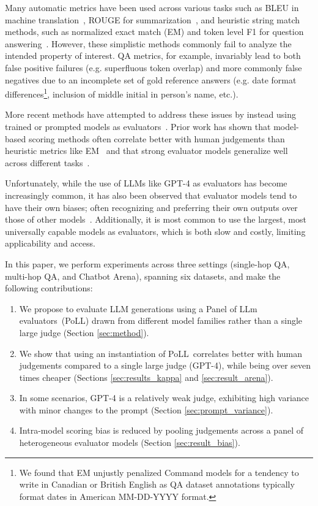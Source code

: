 \documentclass[11pt]{article}
\newcommand{\method}{Panel of LLm evaluators\ }
\newcommand{\acronymnospace}{PoLL}
\newcommand{\acronym}{PoLL\ }
\begin{document}
Many automatic metrics have been used across various tasks such as BLEU in machine translation~\citep{papineni2002bleu}, ROUGE for summarization~\citep{lin-2004-rouge}, and heuristic string match methods, such as normalized exact match (EM) and token level F1 for question answering~\cite{rajpurkar2016squad}. However, these simplistic methods commonly fail to analyze the intended property of interest. QA metrics, for example, invariably lead to both false positive failures (e.g. superfluous token overlap) and more commonly false negatives due to an incomplete set of gold reference answers (e.g. date format differences\footnote{We found that EM unjustly penalized Command models for a tendency to write in Canadian or British English as QA dataset annotations typically format dates in American MM-DD-YYYY format.}, inclusion of middle initial in person's name, etc.).

More recent methods have attempted to address these issues by instead using trained or prompted models as evaluators~\cite{sellam-etal-2020-bleurt, zheng2024judging, li2024leveraging, kocmi-federmann-2023-large, shen-etal-2023-large, li2023prd}. Prior work has shown that model-based scoring methods often correlate better with human judgements than heuristic metrics like EM~\cite{bohnet2022attributed,zheng2024judging} and that strong evaluator models generalize well across different tasks~\cite{huang2024empirical}. 

Unfortunately, while the use of LLMs like GPT-4 as evaluators has become increasingly common, it has also been observed that evaluator models tend to have their own biases; often recognizing and preferring their own outputs over those of other models~\cite{Panickssery2024LLMEval}. Additionally, it is most common to use the largest, most universally capable models as evaluators, which is both slow and costly, limiting applicability and access. 

In this paper, we perform experiments across three settings (single-hop QA, multi-hop QA, and Chatbot Arena), spanning six datasets, and make the following contributions:
\begin{enumerate}
\item We propose to evaluate LLM generations using a \method (\acronymnospace) drawn from different model families rather than a single large judge (Section \ref{sec:method}).
\item We show that using an instantiation of \acronym correlates better with human judgements compared to a single large judge (GPT-4), while being over seven times cheaper (Sections \ref{sec:results_kappa} and \ref{sec:result_arena}).
\item In some scenarios, GPT-4 is a relatively weak judge, exhibiting high variance with minor changes to the prompt (Section \ref{sec:prompt_variance}).
\item Intra-model scoring bias is reduced by pooling judgements across a panel of heterogeneous evaluator models (Section \ref{sec:result_bias}).
\end{enumerate}
\end{document}
